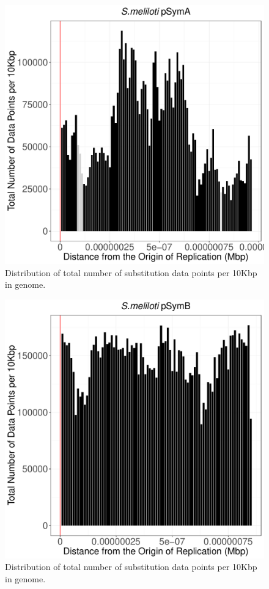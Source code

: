 \documentclass[12pt]{article}
\begin{document}
\begin{figure}
	\includegraphics[width=0.9\linewidth]{./pSymA_total_num_sites_graph.pdf}
	\caption{\label{fig:pa_tot_sites} Distribution of total number of substitution  data points per 10Kbp in genome.}
\end{figure}

\begin{figure}
	\includegraphics[width=0.9\linewidth]{./pSymB_total_num_sites_graph.pdf}
	\caption{\label{fig:pb_tot_sites} Distribution of total number of substitution  data points per 10Kbp in genome.}
\end{figure}
\end{document}
